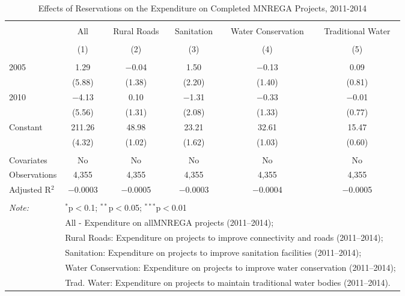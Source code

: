 
\begin{table}[!htbp] \centering 
  \caption{Effects of Reservations on the Expenditure on Completed MNREGA Projects, 2011-2014} 
  \label{main_mnrega_expenditure} 
\scriptsize 
\begin{tabular}{@{\extracolsep{0pt}}lccccc} 
\\[-1.8ex]\hline 
\hline \\[-1.8ex] 
 & All & Rural Roads & Sanitation & Water Conservation & Traditional Water \\ 
\\[-1.8ex] & (1) & (2) & (3) & (4) & (5)\\ 
\hline \\[-1.8ex] 
 2005 & 1.29 & $-$0.04 & 1.50 & $-$0.13 & 0.09 \\ 
  & (5.88) & (1.38) & (2.20) & (1.40) & (0.81) \\ 
  2010 & $-$4.13 & 0.10 & $-$1.31 & $-$0.33 & $-$0.01 \\ 
  & (5.56) & (1.31) & (2.08) & (1.33) & (0.77) \\ 
  Constant & 211.26 & 48.98 & 23.21 & 32.61 & 15.47 \\ 
  & (4.32) & (1.02) & (1.62) & (1.03) & (0.60) \\ 
 \hline \\[-1.8ex] 
Covariates & No & No & No & No & No \\ 
Observations & 4,355 & 4,355 & 4,355 & 4,355 & 4,355 \\ 
Adjusted R$^{2}$ & $-$0.0003 & $-$0.0005 & $-$0.0003 & $-$0.0004 & $-$0.0005 \\ 
\hline 
\hline \\[-1.8ex] 
\textit{Note:}  & \multicolumn{5}{l}{$^{*}$p$<$0.1; $^{**}$p$<$0.05; $^{***}$p$<$0.01} \\ 
 & \multicolumn{5}{l}{All - Expenditure on allMNREGA projects (2011--2014);} \\ 
 & \multicolumn{5}{l}{Rural Roads: Expenditure on projects to improve connectivity and roads (2011--2014);} \\ 
 & \multicolumn{5}{l}{Sanitation:  Expenditure on projects to improve sanitation facilities  (2011--2014);} \\ 
 & \multicolumn{5}{l}{Water Conservation: Expenditure on projects to improve water conservation (2011--2014);} \\ 
 & \multicolumn{5}{l}{Trad. Water: Expenditure on projects to maintain traditional water bodies (2011--2014).} \\ 
\end{tabular} 
\end{table} 
